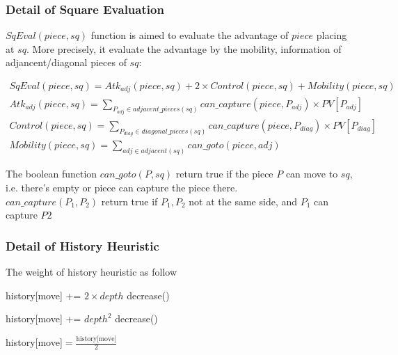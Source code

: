 \documentclass[a4paper, 12pt]{article}  %
\begin{document}
\subsubsection{Detail of Square Evaluation}

$SqEval(piece, sq)$ function is aimed to evaluate the advantage of $piece$ placing at $sq$.
More precisely, it evaluate the advantage by the mobility, information of adjancent/diagonal pieces of $sq$:


\begin{align*}
  SqEval(piece, sq) = Atk_{adj}(piece, sq) + 2\times Control(piece, sq) + Mobility(piece, sq)\\
  Atk_{adj}(piece, sq) = \sum_{P_{adj}\in adjacent\_pieces(sq)} can\_capture(piece, P_{adj})\times PV[P_{adj}]\\
  Control(piece, sq) = \sum_{P_{diag}\in diagonal\_pieces(sq)} can\_capture(piece, P_{diag})\times PV[P_{diag}]\\
  Mobility(piece, sq) = \sum_{adj\in adjacent(sq)} can\_goto(piece, adj)
\end{align*}

The boolean function $can\_goto(P, sq)$ return true if the piece $P$ can move to $sq$, i.e. there's empty or piece can capture the piece there.\\
$can\_capture(P_1, P_2)$ return true if $P_1, P_2$ not at the same side, and $P_1$ can capture $P2$



\subsubsection{Detail of History Heuristic}
The weight of history heuristic as follow

\begin{algorithm}
  \begin{algorithmic}
        \State history[move] += $2 \times depth$
          \State decrease()
        \EndIf
    \EndProcedure

        \State history[move] += $depth^2$
          \State decrease()
        \EndIf
    \EndProcedure

        \State history[move]$ = \frac{\text{history[move]}}{2}$
      \EndFor
    \EndProcedure

  \end{algorithmic}
\end{algorithm}
\end{document}

